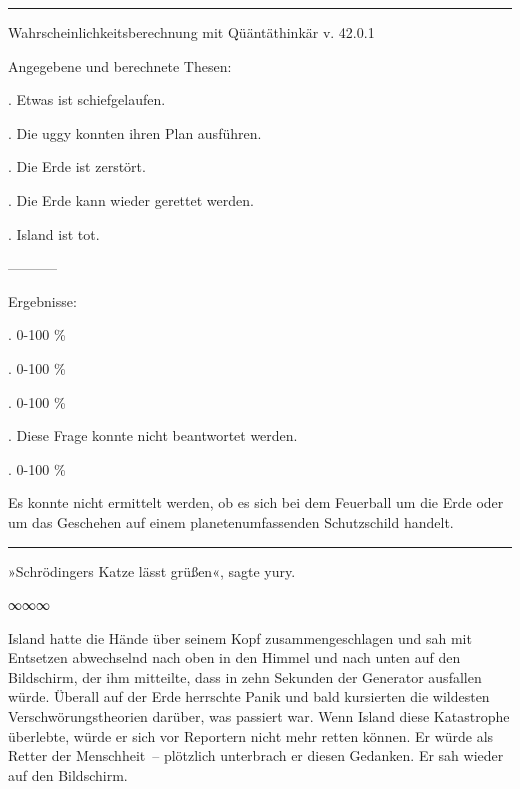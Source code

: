 \noindent \parbox{\textwidth}{ \vspace{3ex} \hrule \vspace{3ex}

    \begin{footnotesize}
    \begin{ttfamily}

\noindent Wahrscheinlichkeitsberechnung mit Qüäntäthinkär v. 42.0.1

\noindent Angegebene und berechnete Thesen:

. Etwas ist schiefgelaufen.

. Die uggy konnten ihren Plan ausführen.

. Die Erde ist zerstört.

. Die Erde kann wieder gerettet werden.

. Island ist tot.

\noindent -----------

\noindent Ergebnisse:

. 0-100 \%

. 0-100 \%

. 0-100 \%

. Diese Frage konnte nicht beantwortet werden.

. 0-100 \%

\noindent Es konnte nicht ermittelt werden, ob es sich bei dem Feuerball um die Erde oder um das Geschehen auf einem planetenumfassenden Schutzschild handelt.

    \end{ttfamily}
    \end{footnotesize}

\vspace{3ex} \hrule \vspace{3ex} }

»Schrödingers Katze lässt grüßen«, sagte yury.

\begin{center}
    ∞∞∞
\end{center}

Island hatte die Hände über seinem Kopf zusammengeschlagen und sah mit Entsetzen abwechselnd nach oben in den Himmel und nach unten auf den Bildschirm, der ihm mitteilte, dass in zehn Sekunden der Generator ausfallen würde. Überall auf der Erde herrschte Panik und bald kursierten die wildesten Verschwörungstheorien darüber, was passiert war. Wenn Island diese Katastrophe überlebte, würde er sich vor Reportern nicht mehr retten können. Er würde als Retter der Menschheit~– plötzlich unterbrach er diesen Gedanken. Er sah wieder auf den Bildschirm.

